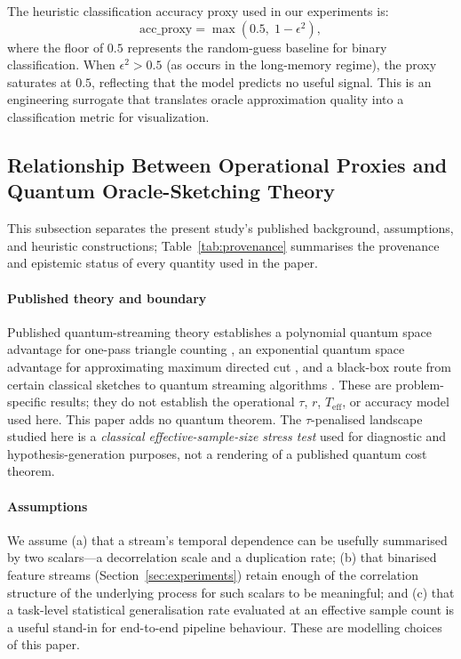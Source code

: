 \documentclass[sensors,article,submit,pdftex,moreauthors]{Definitions/mdpi}
\newcommand{\Teff}{T_{\mathrm{eff}}}
\begin{document}
The heuristic classification accuracy proxy used in our experiments is:
\begin{equation}
\mathrm{acc\_proxy} = \max\!\left(0.5,\; 1 - \epsilon^2\right),
\label{eq:acc_proxy}
\end{equation}
where the floor of $0.5$ represents the random-guess baseline for binary classification. When $\epsilon^2 > 0.5$ (as occurs in the long-memory regime), the proxy saturates at $0.5$, reflecting that the model predicts no useful signal. This is an engineering surrogate that translates oracle approximation quality into a classification metric for visualization.

\subsection{Relationship Between Operational Proxies and Quantum Oracle-Sketching Theory}
\label{sec:proxy_theory}

This subsection separates the present study's published background, assumptions, and heuristic constructions; Table~\ref{tab:provenance} summarises the provenance and epistemic status of every quantity used in the paper.

\paragraph{Published theory and boundary} Published quantum-streaming theory establishes a polynomial quantum space advantage for one-pass triangle counting \citep{kallaugher2021streaming}, an exponential quantum space advantage for approximating maximum directed cut \citep{kallaugher2024maxdicut}, and a black-box route from certain classical sketches to quantum streaming algorithms \citep{kallaugher2025designquantum}. These are problem-specific results; they do not establish the operational $\tau$, $r$, $\Teff$, or accuracy model used here. This paper adds no quantum theorem. The $\tau$-penalised landscape studied here is a \emph{classical effective-sample-size stress test} used for diagnostic and hypothesis-generation purposes, not a rendering of a published quantum cost theorem.

\paragraph{Assumptions} We assume (a) that a stream's temporal dependence can be usefully summarised by two scalars---a decorrelation scale and a duplication rate; (b) that binarised feature streams (Section~\ref{sec:experiments}) retain enough of the correlation structure of the underlying process for such scalars to be meaningful; and (c) that a task-level statistical generalisation rate evaluated at an effective sample count is a useful stand-in for end-to-end pipeline behaviour. These are modelling choices of this paper.
\end{document}

